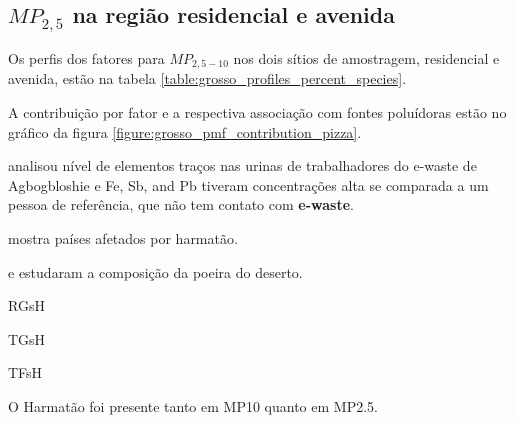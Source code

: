 \subsection{$MP_{2,5}$ na região residencial e avenida}

Os perfis dos fatores para $MP_{2,5-10}$ nos dois sítios de amostragem, 
residencial e avenida, estão na tabela \ref{table:grosso_profiles_percent_species}.

A contribuição por fator e a respectiva associação com fontes poluídoras
estão no gráfico da figura \ref{figure:grosso_pmf_contribution_pizza}. 

\citep{asante2012} analisou nível de elementos traços nas urinas de trabalhadores 
do e-waste de Agbogbloshie e Fe, Sb, and Pb tiveram concentrações alta se comparada
a um pessoa de referência, que não tem contato com \textbf{e-waste}.



\citep{kaku2016}

\citep{prospero2002} mostra países afetados por harmatão. 

\citep{engelbrecht2009a} e \citep{engelbrecht2009b} estudaram a composição 
da poeira do deserto.




\begin{table}[H]
  \centering
  \caption{RGsH}
  
\end{table}

\begin{table}[H]
  \centering
  \caption{TGsH}
  
\end{table}


\begin{table}[H]
  \centering
  \caption{TFsH}
  
\end{table}
O Harmatão foi presente tanto em MP10 quanto em MP2.5.


%
%
%
%
